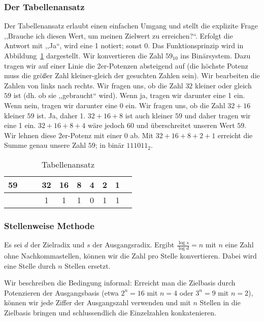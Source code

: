 \subsubsection{Der Tabellenansatz}
%
Der Tabellenansatz erlaubt einen einfachen Umgang und stellt die explizite
Frage ,,Brauche ich diesen Wert, um meinen Zielwert zu erreichen?{}``. Erfolgt
die Antwort mit ,,Ja``, wird eine 1 notiert; sonst 0. Das Funktionsprinzip
wird in Abbildung~\ref{tab:table_approach} dargestellt. Wir konvertieren die
Zahl $59_{10}$ ins Binärsystem. Dazu tragen wir auf einer Linie die
2er-Potenzen absteigend auf (die höchste Potenz muss die größer Zahl
kleiner-gleich der gesuchten Zahlen sein). Wir bearbeiten die Zahlen
von links nach rechts. Wir fragen uns, ob die Zahl $32$ kleiner oder gleich
$59$ ist (dh. ob sie ,,gebraucht`` wird). Wenn ja, tragen wir darunter
eine 1 ein. Wenn nein, tragen wir darunter eine 0 ein.
Wir fragen uns, ob die Zahl $32+16$ kleiner $59$ ist. Ja, daher 1.
$32+16+8$ ist auch kleiner $59$ und daher tragen wir eine 1 ein.
$32+16+8+4$ wäre jedoch $60$ und überschreitet unseren Wert $59$.
Wir lehnen diese 2er-Potenz mit einer $0$ ab. Mit $32+16+8+2+1$ erreicht
die Summe genau unsere Zahl $59$; in binär $111011_2$.
%
\begin{table}[ht]
  \begin{center}
    \begin{tabular}{lccccccccc}
     \hline
      59 & & & 32 & 16 & 8 & 4 & 2 & 1 \\
     \hline \hline
         & & &  1 &  1 & 1 & 0 & 1 & 1
    \end{tabular}
    \caption{Tabellenansatz}
    \label{tab:table_approach}
  \end{center}
\end{table}

\subsubsection{Stellenweise Methode}
%
Es sei $d$ der Zielradix und $s$ der Ausgangsradix. Ergibt
$\frac{\log{s}}{\log{d}} = n$ mit $n$ eine Zahl ohne Nachkommastellen,
können wir die Zahl pro Stelle konvertieren. Dabei wird eine Stelle
durch $n$ Stellen ersetzt.

Wir beschreiben die Bedingung informal: Erreicht man die Zielbasis durch
Potenzieren der Ausgangsbasis
(etwa $2^n = 16$ mit $n=4$ oder $3^n = 9$ mit $n=2$), können wir jede
Ziffer der Ausgangszahl verwenden und mit $n$ Stellen in die Zielbasis
bringen und schlussendlich die Einzelzahlen konkatenieren.


